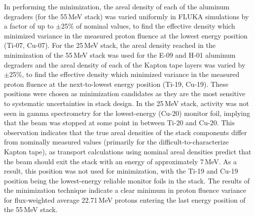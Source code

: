 In performing the  minimization, the areal density of each of the  aluminum degraders (for the 55\,MeV stack)  was varied uniformly in FLUKA simulations  by a factor of up to $\pm$25\% of nominal values, to find the effective density which minimized variance in the measured proton fluence at the lowest energy position (Ti-07, Cu-07).
For the 25\,MeV stack, the areal density reached in the minimization of the 55\,MeV stack was used for  the E-09 and H-01 aluminum degraders
and the areal density of each of the  Kapton tape  layers  was 
varied 
by 
$\pm$25\%, 
to find the effective density which minimized variance in the measured proton fluence at the next-to-lowest energy position (Ti-19, Cu-19).
These 
positions were chosen as  minimization candidates as they are the most sensitive to systematic uncertainties in stack design.
In the 25\,MeV stack, activity was not seen in gamma spectrometry for the lowest-energy (Cu-20) monitor foil, implying that the beam was stopped at some point in between Ti-20 and Cu-20.
This observation 
indicates that  the true areal densities of the stack components differ from nominally measured values (primarily for the difficult-to-characterize Kapton tape), as transport calculations using nominal areal densities predict that the beam should exit the stack 
with an energy of approximately 7\,MeV.
As a result, this position was not used for minimization, with the Ti-19 and Cu-19 position being the lowest-energy reliable monitor foils in the stack.
% 
% 
% 
The results of the minimization technique indicate a clear minimum in proton fluence variance for flux-weighted average 22.71\,MeV protons entering the last energy position of the 55\,MeV stack.
